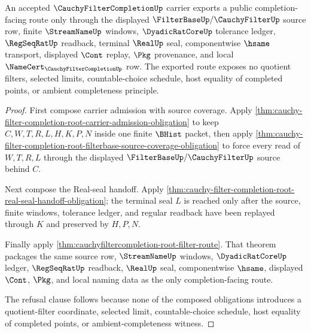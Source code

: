 \begin{theorem}
\label{thm:cauchy-filter-completion-public-export}
An accepted $\CauchyFilterCompletionUp$ carrier exports a public completion-facing route only through the displayed $\FilterBaseUp/\CauchyFilterUp$ source row, finite $\StreamNameUp$ windows, $\DyadicRatCoreUp$ tolerance ledger, $\RegSeqRatUp$ readback, terminal $\RealUp$ seal, componentwise $\hsame$ transport, displayed $\Cont$ replay, $\Pkg$ provenance, and local $\NameCert_{\CauchyFilterCompletionUp}$ row. The exported route exposes no quotient filters, selected limits, countable-choice schedule, host equality of completed points, or ambient completeness principle.
\end{theorem}
\begin{proof}
First compose carrier admission with source coverage. Apply \autoref{thm:cauchy-filter-completion-root-carrier-admission-obligation} to keep $C,W,T,R,L,H,K,P,N$ inside one finite $\BHist$ packet, then apply \autoref{thm:cauchy-filter-completion-root-filterbase-source-coverage-obligation} to force every read of $W,T,R,L$ through the displayed $\FilterBaseUp/\CauchyFilterUp$ source behind $C$.

Next compose the Real-seal handoff. Apply \autoref{thm:cauchy-filter-completion-root-real-seal-handoff-obligation}; the terminal seal $L$ is reached only after the source, finite windows, tolerance ledger, and regular readback have been replayed through $K$ and preserved by $H,P,N$.

Finally apply \autoref{thm:cauchyfiltercompletion-root-filter-route}. That theorem packages the same source row, $\StreamNameUp$ windows, $\DyadicRatCoreUp$ ledger, $\RegSeqRatUp$ readback, $\RealUp$ seal, componentwise $\hsame$, displayed $\Cont$, $\Pkg$, and local naming data as the only completion-facing route.

The refusal clause follows because none of the composed obligations introduces a quotient-filter coordinate, selected limit, countable-choice schedule, host equality of completed points, or ambient-completeness witness.
\end{proof}

